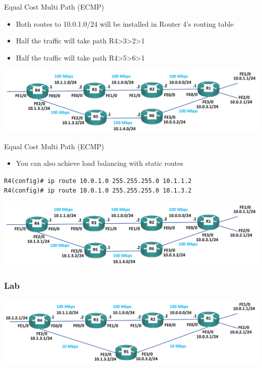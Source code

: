 \documentclass[pdflatex,compress,mathserif]{beamer}
\begin{document}
\begin{frame}{Equal Cost Multi Path (ECMP)}
	\begin{itemize}
		\item Both routes to 10.0.1.0/24 will be installed in Router 4’s routing table
		\item Half the traffic will take path R4>3>2>1
		\item Half the traffic will take path R4>5>6>1
	\end{itemize}
	\begin{center}
		\includegraphics[width=\linewidth]{img/img24}
	\end{center}
\end{frame}

\begin{frame}{Equal Cost Multi Path (ECMP)}
	\begin{itemize}
		\item You can also achieve load balancing with static routes
	\end{itemize}
	\texttt{R4(config)\# ip route 10.0.1.0 255.255.255.0 10.1.1.2
\\
		R4(config)\# ip route 10.0.1.0 255.255.255.0 10.1.3.2}
	\begin{center}
		\includegraphics[width=\linewidth]{img/img25}
	\end{center}
\end{frame}

\begin{frame}
	\frametitle{Lab}
	\begin{center}
		\includegraphics[width=\linewidth]{img/img26}
	\end{center}
\end{frame}
\end{document}
